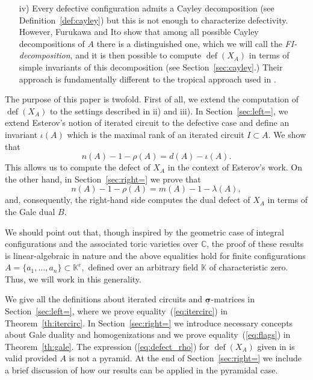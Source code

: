 \documentclass[11pt]{amsart}
\theoremstyle{plain}
\theoremstyle{definition}
\theoremstyle{remark}
\newcommand{\defect}{{\operatorname {def}}}
\newcommand{\beq}{\begin{equation}}
\newcommand{\eeq}{\end{equation}}
\renewcommand{\k}{{\mathbb K}}
\newcommand{\csig}{\ensuremath{\underline{\mathbf \sigma}}}
\numberwithin{equation}{section}
\begin{document}
\begin{enumerate}
\medskip


\item[iv)] Every defective configuration admits a Cayley decomposition (see Definition~\ref{def:cayley}) 
but this is not enough to characterize defectivity.  However, Furukawa and Ito \cite{FI} 
show that among all possible Cayley decompositions of $A$ there is a distinguished one, 
which we will call the {\em FI-decomposition}, and it is then possible
 to compute $\defect(X_A)$ in terms of simple invariants of this decomposition (see Section~\ref{sec:cayley}.)  
 Their approach is fundamentally different to the tropical approach used in \cite{DFS}.  
 
\end{enumerate}

The purpose of this paper is twofold.  First of all, we extend the computation of $\defect(X_A)$
 to the settings described in ii) and iii).  In Section~\ref{sec:left=}, 
we extend Esterov's notion of iterated circuit to the defective case and define an invariant $\iota(A)$ 
which is the maximal rank of an iterated circuit $I \subset A$. We show that
\beq\label{eq:itercirc}
n(A) - 1 - \rho(A) = d(A) - \iota(A).
\eeq
This allows us to compute the defect of $X_A$ in the context of Esterov's work. 
On the other hand, in Section~\ref{sec:right=}
we prove  that 
\beq\label{eq:flags}n(A) - 1 - \rho(A) = m(A) -1 - \lambda(A),
\eeq
and, consequently, the right-hand side computes the dual defect of $X_A$ in terms of the Gale dual $B$.

We should point out that, though inspired by the geometric case of integral configurations and the 
associated toric varieties over $\mathbb C$, the proof of these 
results is linear-algebraic in nature and  the above equalities hold for finite configurations 
$A = \{a_1,\dots,a_n\} \subset \k^e,$ defined over an arbitrary field $\k$ of characteristic zero. Thus, we will work in this generality.



\medskip

We give all the definitions about iterated circuits and $\csig$-matrices in Section~\ref{sec:left=}, where 
we prove equality~(\ref{eq:itercirc}) in Theorem~\ref{th:itercirc}. In Section~\ref{sec:right=} we introduce necessary
concepts about Gale duality  and homogenizations and we prove equality~(\ref{eq:flags}) in Theorem~\ref{th:gale}.
The expression (\ref{eq:defect_rho}) for $\defect(X_A)$ given in \cite{DFS} is valid provided $A$ is not a pyramid.  At the end of Section~\ref{sec:right=}
 we include a brief discussion of how our results can be applied in the pyramidal case.
\end{document}
